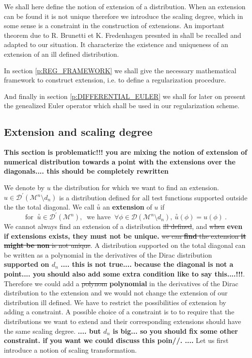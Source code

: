 \documentclass[11pt]{book}
\newcommand{\com}[1]{{\color{red}\bf #1}}
\newcommand{\sbar}[1]{\sout{\color{red} #1}}
\newcommand{\exte}[1]{\overset{\circ}{#1}}
\newcommand{\Dcal}{\mathcal{D}}
\newcommand{\Mcal}{\mathcal{M}}
\theoremstyle{break}
\begin{document}
We shall here define the notion of extension of a distribution. When an extension can be found it is not unique therefore we introduce the scaling degree, which in some sense is a constraint in the construction of extensions. An important theorem due to R. Brunetti et K. Fredenhagen presnted in \cite{brunetti_microlocal_2000} shall be recalled and adapted to our situation. It characterize the existence and uniqueness of an extension of an ill defined distribution.


In section \ref{p:REG_FRAMEWORK} we shall give the necessary mathematical framework to construct extension, i.e. to define a regularization procedure.


And finally in section \ref{p:DIFFERENTIAL_EULER} we shall for later on present the genealized  Euler operator which shall be used in our regularization scheme.


\subsection{Extension and scaling degree}



\com{   This section is problematic!!! you are mixing the notion of extension of numerical distribution towards a point with the extensions over the diagonals.... this should be completely rewritten}



We denote by $u$ the distribution for which we want to find an extension. $u \in \Dcal^\prime(\Mcal^n \setminus d_n )$ is a distribution defined for all test functions supported outside the the total diagonal. We call $\exte{u}$ an \textbf{extension} of $u$ if 
%
\begin{equation*}
\mbox{for } \ \exte{u} \in \Dcal^\prime(\Mcal^n), \ \mbox{ we have } \ \forall \phi \in \Dcal\left(\Mcal^n \setminus d_n \right), \ \exte{u}(\phi) = u(\phi) \ .
\end{equation*}
We cannot always find an extension of a distribution \sbar{ill defined}, and \sbar{when} \com{even if extensions exists, they must not be unique.} \sbar{we can \com{find} the extension \com{it might be non} is not unique}. A distribution supported on the total diagonal can be written as a polynomial in the derivatives of the Dirac distribution \com{supported on $d_n$} \com{.... this is not true.... because the diagonal is not a point.... you should also add some extra condition like to say this....!!!}. Therefore we could add a \sbar{polynom} \com{polynomial} in the derivatives of the Dirac distribution to the extension and we would not change the extension of our distribution ill defined. We have to restrict the possibilities of extension by adding a constraint. A possible choice of a constraint is to to require that the distributions we want to extend and their corresponding extensions should have the same scaling degree. \com{ .... but $d_n$ is big... so you should fix some other constraint.   if you want we could discuss this poin//. ....} Let us first introduce a notion of scaling transformation.
\end{document}
